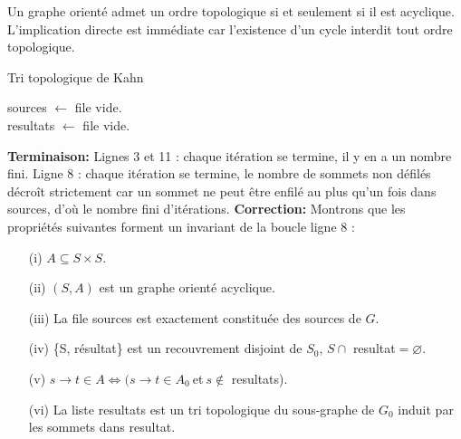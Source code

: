 \documentclass[french, 11pt]{article}
\begin{document}
\begin{prop}{}{}
    Un graphe orienté admet un ordre topologique si et seulement si il est acyclique.
    \tcblower
    L'implication directe est immédiate car l'existence d'un cycle interdit tout ordre topologique.\\
    \begin{algorithm}[H]
        \LinesNumbered
        \caption{Tri topologique de Kahn}
        sources $\gets$ file vide.\\
        resultats $\gets$ file vide.\\
    \end{algorithm}
    \textbf{Terminaison:} Lignes 3 et 11 : chaque itération se termine, il y en a un nombre fini.
    Ligne 8 : chaque itération se termine, le nombre de sommets non défilés décroît strictement car un sommet ne peut être enfilé au plus qu'un fois dans sources, d'où le nombre fini d'itérations.\n
    \textbf{Correction:} Montrons que les propriétés suivantes forment un invariant de la boucle ligne 8 :
    \begin{itemize}[topsep=0pt,itemsep=-0.9 ex]
        \item[(i)] $A \subseteq S\times S$.
        \item[(ii)] $(S,A)$ est un graphe orienté acyclique.
        \item[(iii)] La file sources est exactement constituée des sources de $G$.
        \item[(iv)] \{S, résultat\} est un recouvrement disjoint de $S_0$, $S\cap$ resultat$=\varnothing$.
        \item[(v)] $s\to t\in A \iff (s\to t \in A_0 ~$et$~ s\notin$ resultats).
        \item[(vi)] La liste resultats est un tri topologique du sous-graphe de $G_0$ induit par les sommets dans resultat. 

\end{itemize}
\end{prop}
\end{document}
